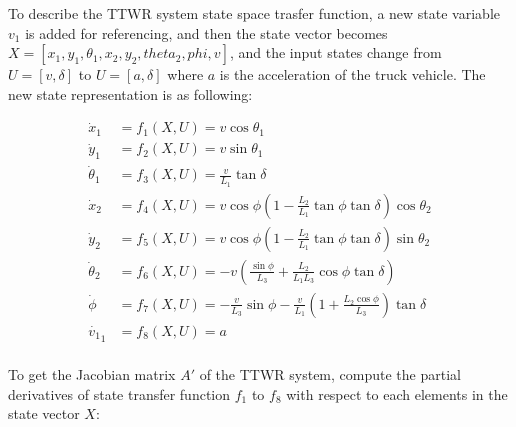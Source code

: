 To describe the TTWR system state space trasfer function, a new state variable $v_1$ is added for referencing, and then the state vector becomes $X = [x_1, y_1, \theta_1, x_2, y_2, theta_2, phi, v]$, and the input states change from $U = [v, \delta]$ to $U = [a, \delta]$ where $a$ is the acceleration of the truck vehicle. The new state representation is as following:

\begin{equation}
    \begin{aligned} 
        \dot{x}_1 &= f_1(X ,U)= v \cos{\theta_1} \\ 
        \dot{y}_1 &= f_2(X ,U) = v \sin{\theta_1} \\ 
        \dot{\theta}_1 &= f_3(X ,U) = \frac{v}{L_1}\tan{\delta} \\ 
        \dot{x}_2 &= f_4(X ,U) = v \cos{\phi} (1 - \frac{L_2}{L_1}\tan{\phi}\tan{\delta})\cos{\theta_2} \\ 
        \dot{y}_2 &= f_5(X ,U) = v \cos{\phi} (1 - \frac{L_2}{L_1}\tan{\phi}\tan{\delta})\sin{\theta_2} \\ 
        \dot{\theta}_2 &= f_6(X ,U) = -v (\frac{\sin{\phi}}{L_3} + \frac{L_2}{L_1 L_3}\cos{\phi}\tan{\delta} ) \\ 
        \dot{\phi} &= f_7(X ,U) = -\frac{v}{L_3}\sin{\phi} - \frac{v}{L_1} ( 1 + \frac{L_2 \cos{\phi}}{L_3}) \tan{\delta} \\ 
        \dot{v_1}_1 &= f_8(X ,U) = a \\ 
    \end{aligned} 
\end{equation}

To get the Jacobian matrix $A'$ of the TTWR system, compute the partial derivatives of state transfer function $f_1$ to $f_8$ with respect to each elements in the state vector $X$:

